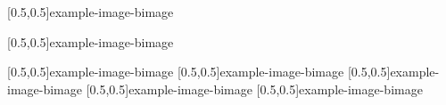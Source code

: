 



\graphicspath{{Figures/}{Figures/Iceland}}


\subtitle{Day 3}
\date{09.10.2019}


    
    
    
    [0.5,0.5]{example-image-b}{image}
    
    [0.5,0.5]{example-image-b}{image}
    
    [0.5,0.5]{example-image-b}{image}
    [0.5,0.5]{example-image-b}{image}
    [0.5,0.5]{example-image-b}{image}
    [0.5,0.5]{example-image-b}{image}
    [0.5,0.5]{example-image-b}{image}


